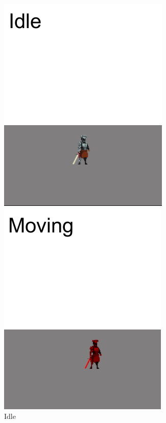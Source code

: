 \documentclass[a4paper, 12pt]{book}
\begin{document}
\begin{figure}[!hb]
  \includegraphics[width=\linewidth]{Images/IdleState.png}
  \caption{Idle}\label{StateFig:Idle}
\endminipage\hfill
{}
  \includegraphics[width=\linewidth]{Images/MovingState.png}

\end{figure}
\end{document}

